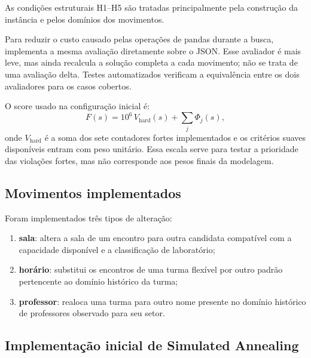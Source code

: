 As condições estruturais H1--H5 são tratadas principalmente pela construção da instância e pelos domínios dos movimentos. 

Para reduzir o custo causado pelas operações de pandas durante a busca,  implementa a mesma avaliação diretamente sobre o JSON. Esse avaliador é mais leve, mas ainda recalcula a solução completa a cada movimento; não se trata de uma avaliação delta. Testes automatizados verificam a equivalência entre os dois avaliadores para os casos cobertos.

O score usado na configuração inicial é:
\begin{equation}
    F(s)=10^6\,V_{\mathrm{hard}}(s)+\sum_j\Phi_j(s),
\end{equation}
onde $V_{\mathrm{hard}}$ é a soma dos sete contadores fortes implementados e os critérios suaves disponíveis entram com peso unitário. Essa escala serve para testar a prioridade das violações fortes, mas não corresponde aos pesos finais da modelagem.

\subsection{Movimentos implementados}
\label{subsec:vizinhancas}

Foram implementados três tipos de alteração:
\begin{enumerate}
    \item \textbf{sala}: altera a sala de um encontro para outra candidata compatível com a capacidade disponível e a classificação de laboratório;
    \item \textbf{horário}: substitui os encontros de uma turma flexível por outro padrão pertencente ao domínio histórico da turma;
    \item \textbf{professor}: realoca uma turma para outro nome presente no domínio histórico de professores observado para seu setor.
\end{enumerate}


\subsection{Implementação inicial de Simulated Annealing}
\label{subsec:sa_solver}

